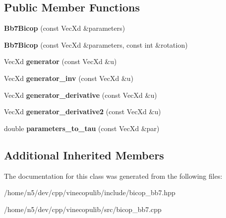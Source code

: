 \subsection*{Public Member Functions}
\begin{DoxyCompactItemize}
\item 
{\bfseries Bb7\+Bicop} (const Vec\+Xd \&parameters)\hypertarget{class_bb7_bicop_afdab924db2ca1ce4e844079a8ece2c3c}{}\label{class_bb7_bicop_afdab924db2ca1ce4e844079a8ece2c3c}

\item 
{\bfseries Bb7\+Bicop} (const Vec\+Xd \&parameters, const int \&rotation)\hypertarget{class_bb7_bicop_a743d4bc3dc98acc793639b5b71e0dd50}{}\label{class_bb7_bicop_a743d4bc3dc98acc793639b5b71e0dd50}

\item 
Vec\+Xd {\bfseries generator} (const Vec\+Xd \&u)\hypertarget{class_bb7_bicop_a517cbe6415b9604e6be776d1a4960a14}{}\label{class_bb7_bicop_a517cbe6415b9604e6be776d1a4960a14}

\item 
Vec\+Xd {\bfseries generator\+\_\+inv} (const Vec\+Xd \&u)\hypertarget{class_bb7_bicop_a933701dad803f12849377c1e4f7cfefa}{}\label{class_bb7_bicop_a933701dad803f12849377c1e4f7cfefa}

\item 
Vec\+Xd {\bfseries generator\+\_\+derivative} (const Vec\+Xd \&u)\hypertarget{class_bb7_bicop_a37f336c2f58917f68a4c92ec117cf902}{}\label{class_bb7_bicop_a37f336c2f58917f68a4c92ec117cf902}

\item 
Vec\+Xd {\bfseries generator\+\_\+derivative2} (const Vec\+Xd \&u)\hypertarget{class_bb7_bicop_a6daf84cf601f12c066104fe9765d48b6}{}\label{class_bb7_bicop_a6daf84cf601f12c066104fe9765d48b6}

\item 
double {\bfseries parameters\+\_\+to\+\_\+tau} (const Vec\+Xd \&par)\hypertarget{class_bb7_bicop_abb052403535f812b716265d8ab347bdb}{}\label{class_bb7_bicop_abb052403535f812b716265d8ab347bdb}

\end{DoxyCompactItemize}
\subsection*{Additional Inherited Members}


The documentation for this class was generated from the following files\+:\begin{DoxyCompactItemize}
\item 
/home/n5/dev/cpp/vinecopulib/include/bicop\+\_\+bb7.\+hpp\item 
/home/n5/dev/cpp/vinecopulib/src/bicop\+\_\+bb7.\+cpp\end{DoxyCompactItemize}
